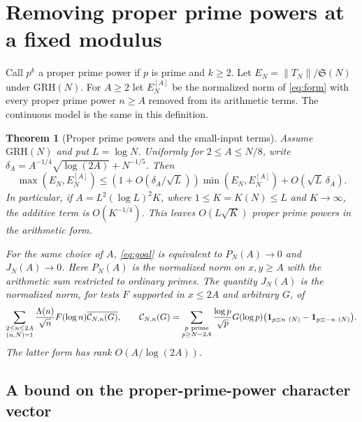 \documentclass[11pt,a4paper]{article}
\numberwithin{equation}{section}
\newtheorem{theorem}{Theorem}[section]
\newcommand{\SSS}{\mathfrak S}
\newcommand{\grh}{\mathrm{GRH}}
\begin{document}
\section{Removing proper prime powers at a fixed modulus}
\label{sec:ppcut}

Call $p^k$ a proper prime power if $p$ is prime and $k\ge2$.
Let $E_N=\|T_N\|/\SSS(N)$ under $\grh(N)$. For $A\ge2$ let
$E_N^{[A]}$ be the normalized norm of \cref{eq:form} with every
proper prime power $n\ge A$ removed from its arithmetic terms.
The continuous model is the same in this definition.

\begin{theorem}[Proper prime powers and the small-input terms]
\label{thm:ppcut}
Assume $\grh(N)$ and put $L=\log N$. Uniformly for $2\le A\le N/8$,
write $\delta_A=A^{-1/4}\sqrt{\log(2A)}+N^{-1/5}$. Then
\begin{equation}
 \max(E_N,E_N^{[A]})
 \le (1+O(\delta_A/\sqrt L))\min(E_N,E_N^{[A]})
        +O(\sqrt L\,\delta_A).
 \label{eq:ppnorm}
\end{equation}
In particular, if $A=L^2(\log L)^2 K$, where
$1\le K=K(N)\le L$ and $K\to\infty$, the
additive term is $O(K^{-1/4})$. This leaves
$O(L\sqrt K)$ proper prime powers in the arithmetic form.

For the same choice of $A$, \cref{eq:goal} is equivalent to
$P_N(A)\to0$ and $J_N(A)\to0$. Here $P_N(A)$ is the normalized
norm on $x,y\ge A$ with the arithmetic sum restricted to
ordinary primes. The quantity $J_N(A)$ is the normalized norm,
for tests $F$ supported in $x\le2A$ and arbitrary $G$, of
\begin{equation}
 \sum_{\substack{2\le n\le2A\\(n,N)=1}}
   \frac{\Lambda(n)}{\sqrt n}F(\log n)
    \overline{\mathcal C_{N,n}(G)},\qquad
 \mathcal C_{N,n}(G)=
 \sum_{\substack{p\ {\rm prime}\\p\ge N-2A}}
     \frac{\log p}{\sqrt p}G(\log p)
     \bigl(\mathbf1_{p\equiv n\ (N)}-\mathbf1_{p\equiv -n\ (N)}\bigr).
 \label{eq:pprows}
\end{equation}
The latter form has rank $O(A/\log(2A))$.
\end{theorem}

\subsection{A bound on the proper-prime-power character vector}
\end{document}
